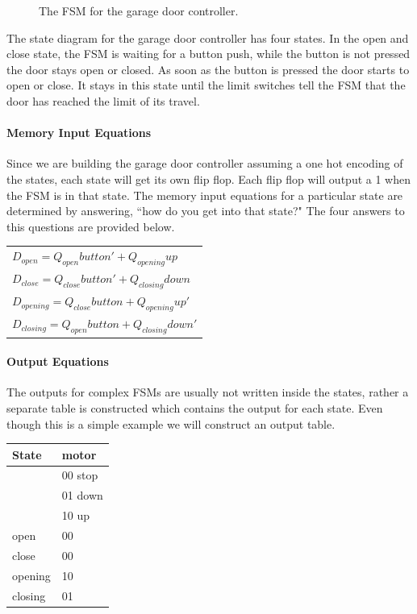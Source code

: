 \begin{enumerate}
\begin{solution}
{\begin{figure}[ht]
\caption{The FSM for the garage door controller.}
\end{figure}

The state diagram for the garage door controller has four states.
In the open and close state, the FSM is waiting for a button push,
while the button is not pressed the door stays open or closed.  As
soon as the button is pressed the door starts to open or close.
It stays in this state until the limit switches tell the FSM that
the door has reached the limit of its travel.

\paragraph{Memory Input Equations}
Since we are building the garage door controller assuming a
one hot encoding of the states, each state will get its own
flip flop.  Each flip flop will output a 1 when the FSM is 
in that state.  The memory input equations for a particular
state are determined by answering, ``how do you get into that 
state?" The four answers to this questions are provided below.

\begin{tabular}{l}
$D_{open} = Q_{open}button' + Q_{opening}up$ \\
$D_{close} = Q_{close}button' + Q_{closing}down$ \\
$D_{opening} = Q_{close}button+ Q_{opening}up'$ \\
$D_{closing}  = Q_{open}button+ Q_{closing}down'$ \\
\end{tabular}


\paragraph{Output Equations}
The outputs for complex FSMs are usually not written inside the
states, rather a separate table is constructed which contains the
output for each state.   Even though this is a simple example
we will construct an output table.

\begin{tabular}{l|l}
State	& motor		\\ \hline
	& 00 stop	\\ \hline
	& 01 down	\\ \hline
	& 10 up		\\ \hline
open    & 00 		\\ \hline
close   & 00		\\ \hline
opening & 10 		\\ \hline
closing & 01 		\\ 
\end{tabular}

}
\end{solution}
\end{enumerate}
